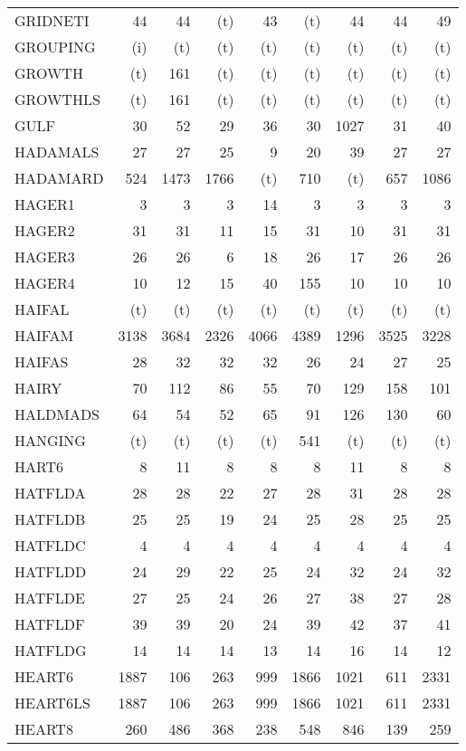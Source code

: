 \documentclass[11pt,twoside]{article}
\begin{document}
{\begin{longtable}[c]{|l|r|r|r|r|r|r|r|r|}
 GRIDNETI & 44 & 44 & (t) & 43 & (t) & 44 & 44 & 49 \\
 GROUPING & (i) & (t) & (t) & (t) & (t) & (t) & (t) & (t) \\
 GROWTH & (t) & 161 & (t) & (t) & (t) & (t) & (t) & (t) \\
 GROWTHLS & (t) & 161 & (t) & (t) & (t) & (t) & (t) & (t) \\
 GULF & 30 & 52 & 29 & 36 & 30 & 1027 & 31 & 40 \\
 HADAMALS & 27 & 27 & 25 & 9 & 20 & 39 & 27 & 27 \\
 HADAMARD & 524 & 1473 & 1766 & (t) & 710 & (t) & 657 & 1086 \\
 HAGER1 & 3 & 3 & 3 & 14 & 3 & 3 & 3 & 3 \\
 HAGER2 & 31 & 31 & 11 & 15 & 31 & 10 & 31 & 31 \\
 HAGER3 & 26 & 26 & 6 & 18 & 26 & 17 & 26 & 26 \\
 HAGER4 & 10 & 12 & 15 & 40 & 155 & 10 & 10 & 10 \\
 HAIFAL & (t) & (t) & (t) & (t) & (t) & (t) & (t) & (t) \\
 HAIFAM & 3138 & 3684 & 2326 & 4066 & 4389 & 1296 & 3525 & 3228 \\
 HAIFAS & 28 & 32 & 32 & 32 & 26 & 24 & 27 & 25 \\
 HAIRY & 70 & 112 & 86 & 55 & 70 & 129 & 158 & 101 \\
 HALDMADS & 64 & 54 & 52 & 65 & 91 & 126 & 130 & 60 \\
 HANGING & (t) & (t) & (t) & (t) & 541 & (t) & (t) & (t) \\
 HART6 & 8 & 11 & 8 & 8 & 8 & 11 & 8 & 8 \\
 HATFLDA & 28 & 28 & 22 & 27 & 28 & 31 & 28 & 28 \\
 HATFLDB & 25 & 25 & 19 & 24 & 25 & 28 & 25 & 25 \\
 HATFLDC & 4 & 4 & 4 & 4 & 4 & 4 & 4 & 4 \\
 HATFLDD & 24 & 29 & 22 & 25 & 24 & 32 & 24 & 32 \\
 HATFLDE & 27 & 25 & 24 & 26 & 27 & 38 & 27 & 28 \\
 HATFLDF & 39 & 39 & 20 & 24 & 39 & 42 & 37 & 41 \\
 HATFLDG & 14 & 14 & 14 & 13 & 14 & 16 & 14 & 12 \\
 HEART6 & 1887 & 106 & 263 & 999 & 1866 & 1021 & 611 & 2331 \\
 HEART6LS & 1887 & 106 & 263 & 999 & 1866 & 1021 & 611 & 2331 \\
 HEART8 & 260 & 486 & 368 & 238 & 548 & 846 & 139 & 259 \\

\end{longtable}}
\end{document}
